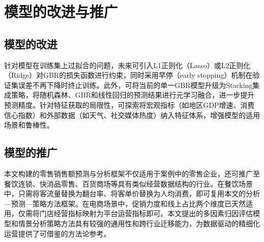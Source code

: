 
\section{模型的改进与推广}

\subsection{模型的改进}

针对模型在训练集上过拟合的问题，未来可引入L1正则化（Lasso）或L2正则化（Ridge）对GBR的损失函数进行约束，同时采用早停（early stopping）机制在验证集误差不再下降时终止训练。此外，可将当前的单一GBR模型升级为Stacking集成策略，将随机森林、GBR和线性回归的预测结果进行元学习融合，进一步提升预测精度。针对特征获取的局限性，可探索将宏观指标（如地区GDP增速、消费信心指数）和外部数据（如天气、社交媒体热度）纳入特征体系，增强模型的适用场景和鲁棒性。

\subsection{模型的推广}

本文构建的零售销售额预测与分析框架不仅适用于案例中的零售企业，还可推广至餐饮连锁、快消品零售、百货商场等具有类似经营数据结构的行业。在餐饮场景中，只需将客流量替换为翻台率、将客单价替换为人均消费，即可复用本文的分析—预测—策略方法框架。在电商场景中，促销力度和线上占比两个维度已天然适用，仅需将门店经营指标映射为平台运营指标即可。本文提出的多因素归因评估模型和情景分析策略方法具有较强的通用性和跨行业迁移能力，为数据驱动的精细化运营提供了可借鉴的方法论参考。
